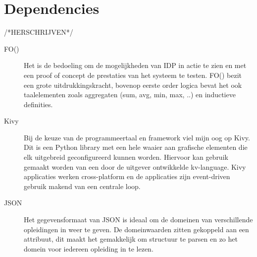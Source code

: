 \section{Dependencies}
/*HERSCHRIJVEN*/
\begin{description}
\item [FO(\textperiodcentered)] Het is de bedoeling om de mogelijkheden van IDP in actie te zien en met een proof of concept de prestaties van het systeem te testen. FO(\textperiodcentered) bezit een grote uitdrukkingskracht, bovenop eerste order logica bevat het ook taalelementen zoals aggregaten (sum, avg, min, max, ..) en inductieve definities.
\item [Kivy] Bij de keuze van de programmeertaal en framework viel mijn oog op Kivy. Dit is een Python library met een hele waaier aan grafische elementen die elk uitgebreid geconfigureerd kunnen worden. Hiervoor kan gebruik gemaakt worden van een door de uitgever ontwikkelde kv-language. Kivy applicaties werken cross-platform en de applicaties zijn event-driven gebruik makend van een centrale loop.
\item [JSON] Het gegevensformaat van JSON is ideaal om de domeinen van verschillende opleidingen in weer te geven. De domeinwaarden zitten gekoppeld aan een attribuut, dit maakt het gemakkelijk om structuur te parsen en zo het domein voor iedereen opleiding in te lezen.
\end{description}